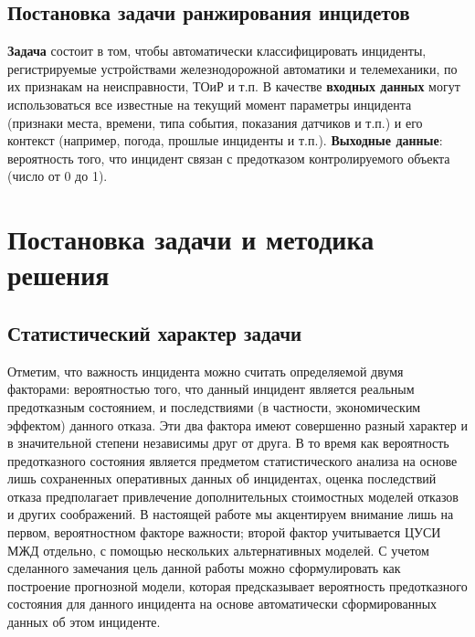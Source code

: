 \subsection{Постановка задачи ранжирования инцидетов}
\textbf{Задача} состоит в том, чтобы автоматически классифицировать инциденты, регистрируемые устройствами железнодорожной автоматики и телемеханики,  по их признакам на неисправности, ТОиР и т.п. В качестве \textbf{входных данных} могут использоваться все известные на текущий момент параметры инцидента (признаки места, времени, типа события, показания датчиков и т.п.) и его контекст (например, погода, прошлые инциденты и т.п.). \textbf{Выходные данные}: вероятность того, что инцидент связан с предотказом контролируемого объекта (число от 0 до 1).


\section{Постановка задачи и методика решения}
\subsection{Статистический характер задачи}\label{sec:stat}
Отметим, что важность инцидента можно считать определяемой двумя факторами: вероятностью того, что данный инцидент является реальным предотказным состоянием, и последствиями (в частности, экономическим эффектом) данного отказа. Эти два фактора имеют совершенно разный характер и в значительной степени независимы друг от друга. В то время как вероятность предотказного состояния является предметом статистического анализа на основе лишь сохраненных оперативных данных об инцидентах, оценка последствий отказа предполагает привлечение дополнительных стоимостных моделей отказов и других соображений. В настоящей работе мы акцентируем внимание лишь на первом, вероятностном факторе важности; второй фактор учитывается ЦУСИ МЖД отдельно, с помощью нескольких альтернативных моделей.
С учетом сделанного замечания цель данной работы можно сформулировать как построение прогнозной модели, которая предсказывает вероятность предотказного состояния для данного инцидента на основе автоматически сформированных данных об этом инциденте.


